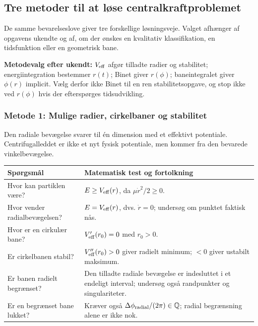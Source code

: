 \subsection{Tre metoder til at løse centralkraftproblemet}
De samme bevarelseslove giver tre forskellige løsningsveje. Valget afhænger af opgavens ukendte og af, om der ønskes en kvalitativ klassifikation, en tidsfunktion eller en geometrisk bane.

\textbf{Metodevalg efter ukendt:} $V_{\rm eff}$ afgør tilladte radier og stabilitet; energiintegration bestemmer $r(t)$; Binet giver $r(\phi)$; baneintegralet giver $\phi(r)$ implicit. Vælg derfor ikke Binet til en ren stabilitetsopgave, og stop ikke ved $r(\phi)$ hvis der efterspørges tidsudvikling.

\subsubsection*{Metode 1: Mulige radier, cirkelbaner og stabilitet}\label{sec:veff}
Den radiale bevægelse svarer til én dimension med et effektivt potentiale. Centrifugalleddet er ikke et nyt fysisk potentiale, men kommer fra den bevarede vinkelbevægelse.
\begin{center}\small\renewcommand{\arraystretch}{1.22}\begin{tabular}{p{47mm}p{91mm}}\toprule
\textbf{Spørgsmål} & \textbf{Matematisk test og fortolkning}\\\midrule
Hvor kan partiklen være? & $E\ge V_{\rm eff}(r)$, da $\mu\dot r^2/2\ge0$.\\
Hvor vender radialbevægelsen? & $E=V_{\rm eff}(r)$, dvs. $\dot r=0$; undersøg om punktet faktisk nås.\\
Hvor er en cirkulær bane? & $V_{\rm eff}'(r_0)=0$ med $r_0>0$.\\
Er cirkelbanen stabil? & $V_{\rm eff}''(r_0)>0$ giver radielt minimum; $<0$ giver ustabilt maksimum.\\
Er banen radielt begrænset? & Den tilladte radiale bevægelse er indesluttet i et endeligt interval; undersøg også randpunkter og singulariteter.\\
Er en begrænset bane lukket? & Kræver også $\Delta\phi_{\rm radial}/(2\pi)\in\mathbb Q$; radial begrænsning alene er ikke nok.\\\bottomrule
\end{tabular}\end{center}

